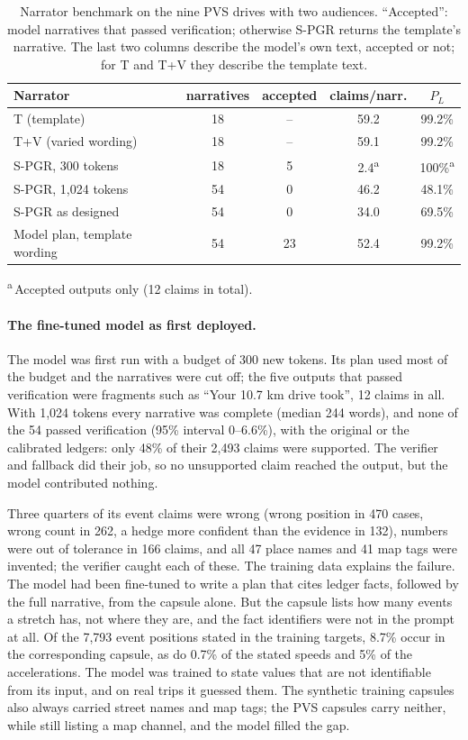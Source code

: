 \begin{table}[t]
\caption{Narrator benchmark on the nine PVS drives with two audiences. ``Accepted'': model narratives that passed verification; otherwise S-PGR returns the template's narrative. The last two columns describe the model's own text, accepted or not; for T and T+V they describe the template text.}
\label{tab:bench}
\centering
\small
\setlength{\tabcolsep}{4pt}
\begin{tabular}{@{}lcccc@{}}
\toprule
Narrator & narratives & accepted & claims/narr. & $P_L$ \\
\midrule
T (template) & 18 & -- & 59.2 & 99.2\% \\
T+V (varied wording) & 18 & -- & 59.1 & 99.2\% \\
S-PGR, 300 tokens & 18 & 5 & 2.4\textsuperscript{a} & 100\%\textsuperscript{a} \\
S-PGR, 1{,}024 tokens & 54 & 0 & 46.2 & 48.1\% \\
S-PGR as designed & 54 & 0 & 34.0 & 69.5\% \\
Model plan, template wording & 54 & 23 & 52.4 & 99.2\% \\
\bottomrule
\end{tabular}

\smallskip
{\footnotesize\textsuperscript{a}\,Accepted outputs only (12 claims in total).}
\end{table}

\paragraph{The fine-tuned model as first deployed.}
The model was first run with a budget of 300 new tokens.
Its plan used most of the budget and the narratives were cut off; the five outputs that passed verification were fragments such as ``Your 10.7 km drive took'', 12 claims in all.
With 1{,}024 tokens every narrative was complete (median 244 words), and none of the 54 passed verification (95\% interval 0--6.6\%), with the original or the calibrated ledgers: only 48\% of their 2{,}493 claims were supported.
The verifier and fallback did their job, so no unsupported claim reached the output, but the model contributed nothing.

Three quarters of its event claims were wrong (wrong position in 470 cases, wrong count in 262, a hedge more confident than the evidence in 132), numbers were out of tolerance in 166 claims, and all 47 place names and 41 map tags were invented; the verifier caught each of these.
The training data explains the failure.
The model had been fine-tuned to write a plan that cites ledger facts, followed by the full narrative, from the capsule alone.
But the capsule lists how many events a stretch has, not where they are, and the fact identifiers were not in the prompt at all.
Of the 7{,}793 event positions stated in the training targets, 8.7\% occur in the corresponding capsule, as do 0.7\% of the stated speeds and 5\% of the accelerations.
The model was trained to state values that are not identifiable from its input, and on real trips it guessed them.
The synthetic training capsules also always carried street names and map tags; the PVS capsules carry neither, while still listing a map channel, and the model filled the gap.

